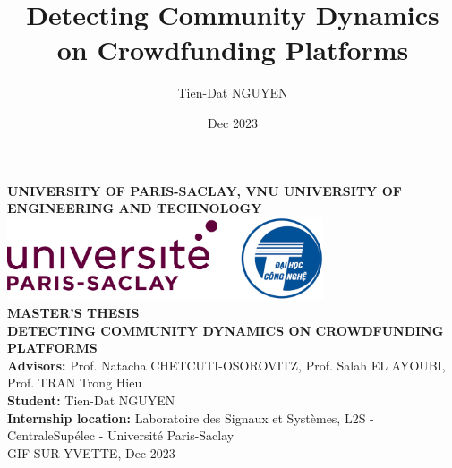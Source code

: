 \title{Detecting Community Dynamics on Crowdfunding Platforms}
\author{Tien-Dat NGUYEN}
\date{Dec 2023}

\begin{titlepage}
	\centering
	\vspace*{1cm}

	{\Large \textbf{UNIVERSITY OF PARIS-SACLAY, VNU UNIVERSITY OF ENGINEERING AND TECHNOLOGY}}\\[1cm]

	\includegraphics[width=0.7\textwidth]{images/logo_combine.png}\\[5cm]

	{\Large \textbf{MASTER'S THESIS}}\\[0.5cm]

	{\Huge \textbf{DETECTING COMMUNITY DYNAMICS ON CROWDFUNDING PLATFORMS}\\[2cm]

	{\large \textbf{Advisors:} Prof. Natacha CHETCUTI-OSOROVITZ, Prof. Salah EL AYOUBI, Prof. TRAN Trong Hieu}\\[0.5cm]

	{\large \textbf{Student:} Tien-Dat NGUYEN}\\[0.5cm]

	{\large \textbf{Internship location:} Laboratoire des Signaux et Systèmes, L2S - CentraleSupélec - Université Paris-Saclay}\\[0.25cm]

	{\large GIF-SUR-YVETTE, Dec 2023 }\\[0.25cm]


	\vfill
	}
\end{titlepage}